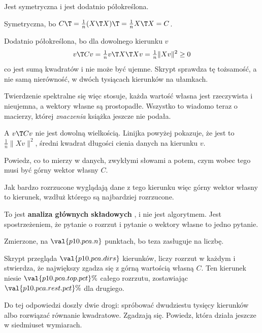 \begin{fr}
\begin{ansblock}
Jest symetryczna i jest dodatnio półokreślona.
\end{ansblock}

Symetryczna, bo $C\T = \frac{1}{n}(X\T X)\T = \frac{1}{n}X\T X = C$.

Dodatnio półokreślona, bo dla dowolnego kierunku $v$
\[ v\T C v = \tfrac{1}{n}v\T X\T X v = \tfrac{1}{n}\lVert Xv \rVert^{2} \ge 0 \]
co jest sumą kwadratów i nie może być ujemne. Skrypt sprawdza tę tożsamość, a
nie samą nierówność, w dwóch tysiącach kierunków na ułamkach.

Twierdzenie spektralne się więc stosuje, każda wartość własna jest rzeczywista
i nieujemna, a wektory własne są prostopadłe. Wszystko to wiadomo teraz o
macierzy, której \emph{znaczenia} książka jeszcze nie podała.
\end{fr}

\begin{fr}
A $v\T Cv$ nie jest dowolną wielkością. Linijka powyżej pokazuje, że jest to
$\frac{1}{n}\lVert Xv \rVert^{2}$, średni kwadrat długości cienia danych na
kierunku $v$.

Powiedz, co to mierzy w danych, zwykłymi słowami \dash{} a potem, czym wobec
tego musi być górny wektor własny $C$.
\dotline
\nextframe
\end{fr}

\begin{fr}
\begin{ansblock}
Jak bardzo rozrzucone wyglądają dane z tego kierunku \dash{} więc górny wektor
własny to kierunek, wzdłuż którego są najbardziej rozrzucone.
\end{ansblock}

To jest \textbf{analiza głównych
składowych}%
, i nie jest algorytmem. Jest
spostrzeżeniem, że pytanie o rozrzut i pytanie o wektory własne to jedno
pytanie.

Zmierzone, na $\val{p10.pca.n}$ punktach, bo teza zasługuje na liczbę.

Skrypt przegląda $\val{p10.pca.dirs}$ kierunków, liczy rozrzut w każdym i
stwierdza, że największy zgadza się z górną wartością własną $C$. Ten kierunek
niesie $\val{p10.pca.top.pct}\%$ całego rozrzutu, zostawiając
$\val{p10.pca.rest.pct}\%$ dla drugiego.

Do tej odpowiedzi doszły dwie drogi: spróbować dwudziestu tysięcy kierunków
albo rozwiązać równanie kwadratowe. Zgadzają się. Powiedz, która działa jeszcze
w siedmiuset wymiarach.
\dotline
\nextframe
\end{fr}

